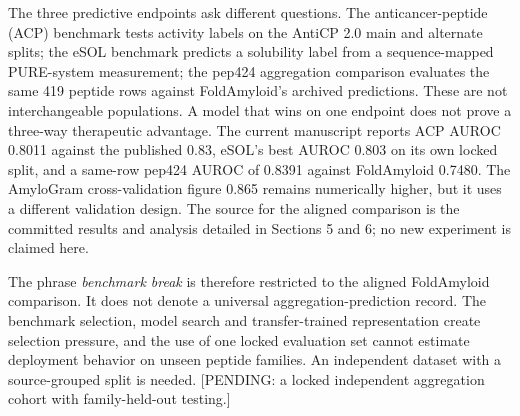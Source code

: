 \newpage



The three predictive endpoints ask different questions. The anticancer-peptide (ACP) benchmark tests activity labels on the AntiCP 2.0 main and alternate splits; the eSOL benchmark predicts a solubility label from a sequence-mapped PURE-system measurement; the pep424 aggregation comparison evaluates the same 419 peptide rows against FoldAmyloid's archived predictions. These are not interchangeable populations. A model that wins on one endpoint does not prove a three-way therapeutic advantage. The current manuscript reports ACP AUROC 0.8011 against the published 0.83, eSOL's best AUROC 0.803 on its own locked split, and a same-row pep424 AUROC of 0.8391 against FoldAmyloid 0.7480. The AmyloGram cross-validation figure 0.865 remains numerically higher, but it uses a different validation design. The source for the aligned comparison is the committed results and analysis detailed in Sections 5 and 6; no new experiment is claimed here.

The phrase \emph{benchmark break} is therefore restricted to the aligned FoldAmyloid comparison. It does not denote a universal aggregation-prediction record. The benchmark selection, model search and transfer-trained representation create selection pressure, and the use of one locked evaluation set cannot estimate deployment behavior on unseen peptide families. An independent dataset with a source-grouped split is needed. {[}PENDING: a locked independent aggregation cohort with family-held-out testing.{]}


